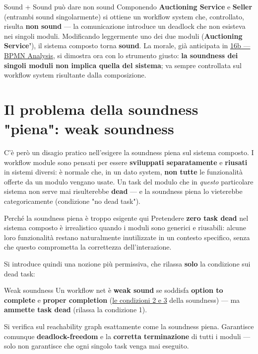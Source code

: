 \begin{boxexample}{Sound + Sound può dare non sound}
Componendo \textbf{Auctioning Service} e \textbf{Seller} (entrambi sound singolarmente) si ottiene un workflow system che, controllato, risulta \textbf{non sound} — la comunicazione introduce un deadlock che non esisteva nei singoli moduli. Modificando leggermente uno dei due moduli (\textbf{Auctioning Service'}), il sistema composto torna \textbf{sound}. La morale, già anticipata in \hyperref[ch:16b]{16b — BPMN Analysis}, si dimostra ora con lo strumento giusto: \textbf{la soundness dei singoli moduli non implica quella del sistema}; va sempre controllata sul workflow system risultante dalla composizione.
\end{boxexample}

\section{\texorpdfstring{Il problema della soundness "piena": weak soundness}{Il problema della soundness "piena": weak soundness}}

C'è però un disagio pratico nell'esigere la soundness piena sul sistema composto. I workflow module sono pensati per essere \textbf{sviluppati separatamente} e \textbf{riusati} in sistemi diversi: è normale che, in un dato system, \textbf{non tutte} le funzionalità offerte da un modulo vengano usate. Un task del modulo che in \emph{questo} particolare sistema non serve mai risulterebbe \textbf{dead} — e la soundness piena lo vieterebbe categoricamente (condizione "no dead task").

\begin{boxwarning}{Perché la soundness piena è troppo esigente qui}
Pretendere \textbf{zero task dead} nel sistema composto è irrealistico quando i moduli sono generici e riusabili: alcune loro funzionalità restano naturalmente inutilizzate in un contesto specifico, senza che questo comprometta la correttezza dell'interazione.
\end{boxwarning}

Si introduce quindi una nozione più permissiva, che rilassa \textbf{solo} la condizione sui dead task:

\begin{boxdefinition}{Weak soundness}
Un workflow net è \textbf{weak sound} se soddisfa \textbf{option to complete} e \textbf{proper completion} (\hyperref[ch:12]{le condizioni 2 e 3} della soundness) — ma \textbf{ammette task dead} (rilassa la condizione 1).

Si verifica sul reachability graph esattamente come la soundness piena. Garantisce comunque \textbf{deadlock-freedom} e la \textbf{corretta terminazione} di tutti i moduli — solo non garantisce che ogni singolo task venga mai eseguito.
\end{boxdefinition}

